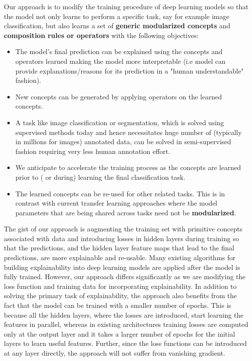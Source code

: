 \documentclass{JMLFS}
\begin{document}
Our approach is to modify the training procedure of deep learning models so that the model not only learns to perform a specific task, say for example image classification, but also learns a set of \textbf{generic modularized concepts} and \textbf{composition rules or operators} with the following objectives:
\begin{itemize}
\item The model's final prediction can be explained using the concepts and operators learned making the model more interpretable (i.e model can provide explanations/reasons for its prediction in a "human understandable" fashion).
\item New concepts can be generated by applying operators on the learned concepts.
\item A task like image classification or segmentation, which is solved using supervised methods today and hence necessitates huge number of (typically in millions for images) annotated data, can be solved in semi-supervised fashion requiring very less human annotation effort.
\item We anticipate to accelerate the training process as the concepts are learned prior to ( or during) learning the final classification task.
\item The learned concepts can be re-used for other related tasks. This is in contrast with current transfer learning approaches where the model parameters that are being shared across tasks need not be \textbf{modularized}.
\end{itemize}


The gist of our approach is  augmenting the training set with primitive concepts associated with data and introducing losses in hidden layers during training so that the predictions, and the hidden layer feature maps that lead to the final predictions, are more explainable and re-usable.
Many existing algorithms \cite{ribeiro2016should} \cite{lundberg2017unified} \cite{zhou2016learning} for building explainability into deep learning models are applied after the model is fully trained.  However, our approach differs significantly as we are modifying the loss function and training data for incorporating explainability.
In addition to solving  the primary task of explainability, the approach also benefits from the fact that  the model can be trained with a smaller number of epochs.
This is because all the hidden layers, where the losses are introduced,  start learning the features in parallel, whereas in existing architectures training losses are computed only at the output layer and it takes a larger number of epochs for the initial layers to learn useful features.
Further, since the loss functions can be introduced at any layer directly, the approach will not suffer from vanishing gradient.
\end{document}
